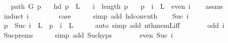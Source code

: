 \begin{isabellebody}
\ \ \ {\isachardoublequoteopen}path\ G\ p{\isachardoublequoteclose}\isanewline
\ \ \ {\isachardoublequoteopen}hd\ p\ {\isasymin}\ L{\isachardoublequoteclose}\isanewline
\ \ \ {\isachardoublequoteopen}i\ {\isacharless}{\kern0pt}\ length\ p{\isachardoublequoteclose}\isanewline
\ \ \ {\isachardoublequoteopen}p\ {\isacharbang}{\kern0pt}\ i\ {\isasymin}\ L\ {\isasymlongleftrightarrow}\ even\ i{\isachardoublequoteclose}\isanewline
%
\isadelimproof
\ \ %
\endisadelimproof
%
\isatagproof
{}\isamarkupfalse%
\ assms\isanewline
{}\isamarkupfalse%
\ {\isacharparenleft}{\kern0pt}induct\ i{\isacharparenright}{\kern0pt}\isanewline
\ \ \isamarkupfalse%
\ {}\isanewline
\ \ \isamarkupfalse%
\ {\isacharquery}{\kern0pt}case\isanewline
\ \ \ \ \isamarkupfalse%
\ {\isacharparenleft}{\kern0pt}simp\ add{\isacharcolon}{\kern0pt}\ hd{\isacharunderscore}{\kern0pt}conv{\isacharunderscore}{\kern0pt}nth{\isacharparenright}{\kern0pt}\isanewline
{}\isamarkupfalse%
\isanewline
\ \ \isamarkupfalse%
\ {\isacharparenleft}{\kern0pt}Suc\ i{\isacharparenright}{\kern0pt}\isanewline
\ \ \isamarkupfalse%
\ {\isachardoublequoteopen}p\ {\isacharbang}{\kern0pt}\ Suc\ i\ {\isasymin}\ L\ {\isasymlongleftrightarrow}\ p\ {\isacharbang}{\kern0pt}\ i\ {\isasymnotin}\ L{\isachardoublequoteclose}\isanewline
\ \ \ \ \isamarkupfalse%
\ {\isacharparenleft}{\kern0pt}auto\ simp\ add{\isacharcolon}{\kern0pt}\ nth{\isacharunderscore}{\kern0pt}mem{\isacharunderscore}{\kern0pt}L{\isacharunderscore}{\kern0pt}iff{\isacharunderscore}{\kern0pt}{}{\isacharparenright}{\kern0pt}\isanewline
\ \ \isamarkupfalse%
\ \isamarkupfalse%
\ {\isachardoublequoteopen}{\isachardot}{\kern0pt}{\isachardot}{\kern0pt}{\isachardot}{\kern0pt}\ {\isasymlongleftrightarrow}\ odd\ i{\isachardoublequoteclose}\isanewline
\ \ \ \ \isamarkupfalse%
\ Suc{\isachardot}{\kern0pt}prems\isanewline
\ \ \ \ \isamarkupfalse%
\ {\isacharparenleft}{\kern0pt}simp\ add{\isacharcolon}{\kern0pt}\ Suc{\isachardot}{\kern0pt}hyps{\isacharparenright}{\kern0pt}\isanewline
\ \ \isamarkupfalse%
\ \isamarkupfalse%
\ {\isachardoublequoteopen}{\isachardot}{\kern0pt}{\isachardot}{\kern0pt}{\isachardot}{\kern0pt}\ {\isasymlongleftrightarrow}\ even\ {\isacharparenleft}{\kern0pt}Suc\ i{\isacharparenright}{\kern0pt}{\isachardoublequoteclose}\isanewline

\end{isabellebody}
